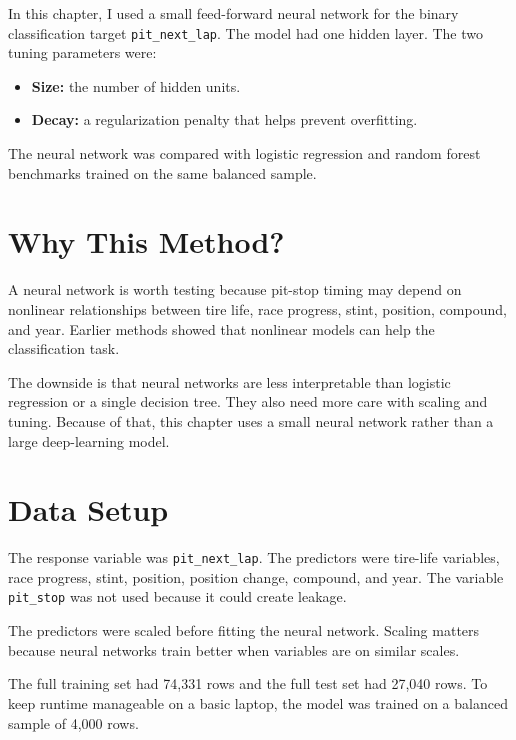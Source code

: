 \documentclass[11pt,oneside,openany]{book}
\begin{document}
In this chapter, I used a small feed-forward neural network for the binary classification target \texttt{pit\_next\_lap}. The model had one hidden layer. The two tuning parameters were:

\begin{itemize}
    \item \textbf{Size:} the number of hidden units.
    \item \textbf{Decay:} a regularization penalty that helps prevent overfitting.
\end{itemize}

The neural network was compared with logistic regression and random forest benchmarks trained on the same balanced sample.

\section{Why This Method?}

A neural network is worth testing because pit-stop timing may depend on nonlinear relationships between tire life, race progress, stint, position, compound, and year. Earlier methods showed that nonlinear models can help the classification task.

The downside is that neural networks are less interpretable than logistic regression or a single decision tree. They also need more care with scaling and tuning. Because of that, this chapter uses a small neural network rather than a large deep-learning model.

\section{Data Setup}

The response variable was \texttt{pit\_next\_lap}. The predictors were tire-life variables, race progress, stint, position, position change, compound, and year. The variable \texttt{pit\_stop} was not used because it could create leakage.

The predictors were scaled before fitting the neural network. Scaling matters because neural networks train better when variables are on similar scales.

The full training set had 74,331 rows and the full test set had 27,040 rows. To keep runtime manageable on a basic laptop, the model was trained on a balanced sample of 4,000 rows.
\end{document}
